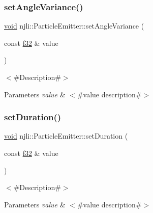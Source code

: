 \subsubsection{\texorpdfstring{set\+Angle\+Variance()}{setAngleVariance()}}
{\footnotesize\ttfamily \mbox{\hyperlink{_thread_8h_af1e856da2e658414cb2456cb6f7ebc66}{void}} njli\+::\+Particle\+Emitter\+::set\+Angle\+Variance (\begin{DoxyParamCaption}\item[{const \mbox{\hyperlink{_util_8h_a5f6906312a689f27d70e9d086649d3fd}{f32}} \&}]{value }\end{DoxyParamCaption})}

$<$\#\+Description\#$>$


\begin{DoxyParams}{Parameters}
{\em value} & $<$\#value description\#$>$ \\
\hline
\end{DoxyParams}
\mbox{\label{classnjli_1_1_particle_emitter_a8bfdce6e6589f4bc5974c7a8339c3e41}} 
\subsubsection{\texorpdfstring{set\+Duration()}{setDuration()}}
{\footnotesize\ttfamily \mbox{\hyperlink{_thread_8h_af1e856da2e658414cb2456cb6f7ebc66}{void}} njli\+::\+Particle\+Emitter\+::set\+Duration (\begin{DoxyParamCaption}\item[{const \mbox{\hyperlink{_util_8h_a5f6906312a689f27d70e9d086649d3fd}{f32}} \&}]{value }\end{DoxyParamCaption})}

$<$\#\+Description\#$>$


\begin{DoxyParams}{Parameters}
{\em value} & $<$\#value description\#$>$ \\
\hline
\end{DoxyParams}
\mbox{\label{classnjli_1_1_particle_emitter_aaadaa67989345435f0f91135bd20659f}} 
